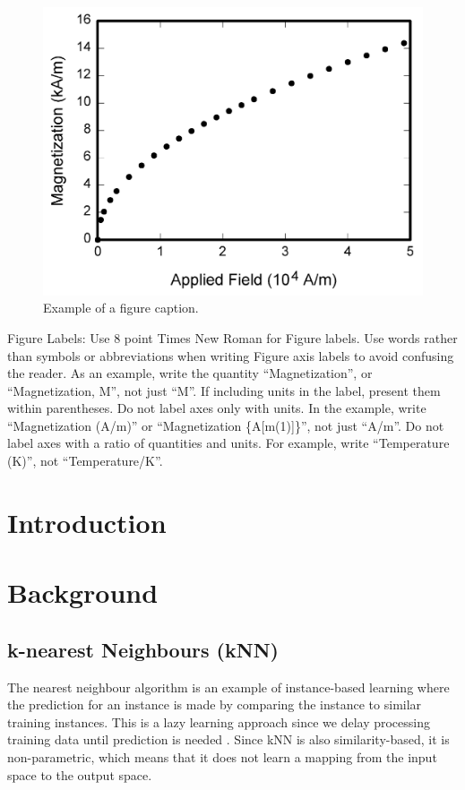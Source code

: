 \documentclass[conference]{IEEEtran}
\begin{document}
\begin{figure}[htbp]
\centerline{\includegraphics{fig1.png}}
\caption{Example of a figure caption.}
\label{fig}
\end{figure}

Figure Labels: Use 8 point Times New Roman for Figure labels. Use words 
rather than symbols or abbreviations when writing Figure axis labels to 
avoid confusing the reader. As an example, write the quantity 
``Magnetization'', or ``Magnetization, M'', not just ``M''. If including 
units in the label, present them within parentheses. Do not label axes only 
with units. In the example, write ``Magnetization (A/m)'' or ``Magnetization 
\{A[m(1)]\}'', not just ``A/m''. Do not label axes with a ratio of 
quantities and units. For example, write ``Temperature (K)'', not 
``Temperature/K''.

\section{Introduction}
\section{Background}

\subsection{k-nearest Neighbours (kNN)}
The nearest neighbour algorithm is an example of instance-based learning where the prediction for an instance is made by comparing the instance to similar training instances. This is a lazy learning approach since we delay processing training data until prediction is needed \cite{kelleher2020fundamentals}. Since kNN is also similarity-based, it is non-parametric, which means that it does not learn a mapping from the input space to the output space.
\end{document}
